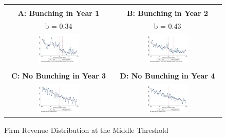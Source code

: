 \begin{figure}[t]
\caption{Firm Revenue Distribution at the Middle Threshold}

\label{fig:MiddleThreshold} 
\begin{centering}
\begin{tabular}{cc}
\vspace{0.2cm}
  & \vspace{0.2cm}
 \tabularnewline
\textbf{A: Bunching in Year 1}  & \textbf{B: Bunching in Year 2}\tabularnewline
b = 0.34  & b = 0.43\tabularnewline
\includegraphics[width=0.4\textwidth]{graphs/BunchingYear1_5Million_Degree4_30000}  & \includegraphics[width=0.4\textwidth]{graphs/BunchingYear2_5Million_Degree4_30000}\tabularnewline
\vspace{0.2cm}
  & \vspace{0.2cm}
 \tabularnewline
\textbf{C: No Bunching in Year 3}  & \textbf{D: No Bunching in Year 4}\tabularnewline
\includegraphics[width=0.4\textwidth]{graphs/BunchingYear3_5Million_Degree4_30000}  & \includegraphics[width=0.4\textwidth]{graphs/BunchingYear4_5Million_Degree4_30000}\tabularnewline

\end{tabular}
\end{centering}
\end{figure}
